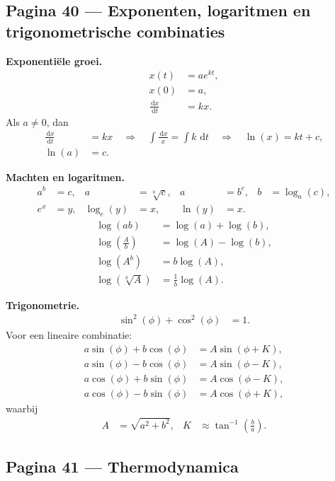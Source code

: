 \documentclass[11pt]{article}
\newcommand{\dd}{\,\mathrm{d}}
\newcommand{\td}[2]{\frac{\dd #1}{\dd #2}}
\begin{document}
\newpage

\subsection*{Pagina 40 --- Exponenten, logaritmen en trigonometrische combinaties}

\textbf{Exponentiële groei.}
\begin{align*}
x(t) &= a e^{kt},\\
x(0) &= a,\\
\td{x}{t} &= kx.
\end{align*}
Als $a\neq 0$, dan
\begin{align*}
\frac{\dd x}{\dd t} &= kx
\quad\Longrightarrow\quad
\int \frac{\dd x}{x} = \int k\,\dd t
\quad\Longrightarrow\quad
\ln(x)=kt+c,\\
\ln(a)&=c.
\end{align*}

\textbf{Machten en logaritmen.}
\begin{align*}
a^b &= c,
&
a &= \sqrt[b]{c},
&
a &= b^c,
&
b &= \log_a(c),\\
e^x &= y,
&
\log_e(y)&=x,
&
\ln(y)&=x.
\end{align*}
\begin{align*}
\log(ab) &= \log(a)+\log(b),\\
\log\left(\frac{A}{b}\right) &= \log(A)-\log(b),\\
\log(A^b) &= b\log(A),\\
\log\left(\sqrt[b]{A}\right) &= \frac{1}{b}\log(A).
\end{align*}

\textbf{Trigonometrie.}
\begin{align*}
\sin^2(\phi)+\cos^2(\phi)&=1.
\end{align*}
Voor een lineaire combinatie:
\begin{align*}
a\sin(\phi)+b\cos(\phi)&=A\sin(\phi+K),\\
a\sin(\phi)-b\cos(\phi)&=A\sin(\phi-K),\\
a\cos(\phi)+b\sin(\phi)&=A\cos(\phi-K),\\
a\cos(\phi)-b\sin(\phi)&=A\cos(\phi+K),
\end{align*}
waarbij
\begin{align*}
A &= \sqrt{a^2+b^2},
&
K &\approx \tan^{-1}\left(\frac{b}{a}\right).
\end{align*}

\subsection*{Pagina 41 --- Thermodynamica}
\end{document}
